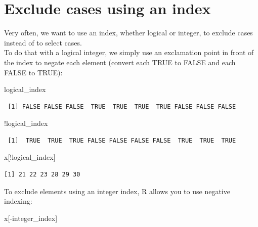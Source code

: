 \documentclass[
]{book}
\newenvironment{Shaded}{\begin{snugshade}}{\end{snugshade}}
\newcommand{\NormalTok}[1]{#1}
\newcommand{\SpecialCharTok}[1]{\textcolor[rgb]{0.00,0.00,0.00}{#1}}
\begin{document}
\hypertarget{exclude-cases-using-an-index}{%
\section{Exclude cases using an index}\label{exclude-cases-using-an-index}}

Very often, we want to use an index, whether logical or integer, to exclude cases instead of to select cases.\\
To do that with a logical integer, we simply use an exclamation point in front of the index to negate each element (convert each TRUE to FALSE and each FALSE to TRUE):

\begin{Shaded}
\begin{Highlighting}[]
\NormalTok{logical\_index}
\end{Highlighting}
\end{Shaded}

\begin{verbatim}
 [1] FALSE FALSE FALSE  TRUE  TRUE  TRUE  TRUE FALSE FALSE FALSE
\end{verbatim}

\begin{Shaded}
\begin{Highlighting}[]
\SpecialCharTok{!}\NormalTok{logical\_index}
\end{Highlighting}
\end{Shaded}

\begin{verbatim}
 [1]  TRUE  TRUE  TRUE FALSE FALSE FALSE FALSE  TRUE  TRUE  TRUE
\end{verbatim}

\begin{Shaded}
\begin{Highlighting}[]
\NormalTok{x[}\SpecialCharTok{!}\NormalTok{logical\_index]}
\end{Highlighting}
\end{Shaded}

\begin{verbatim}
[1] 21 22 23 28 29 30
\end{verbatim}

To exclude elements using an integer index, R allows you to use negative indexing:

\begin{Shaded}
\begin{Highlighting}[]
\NormalTok{x[}\SpecialCharTok{{-}}\NormalTok{integer\_index]}
\end{Highlighting}
\end{Shaded}
\end{document}
